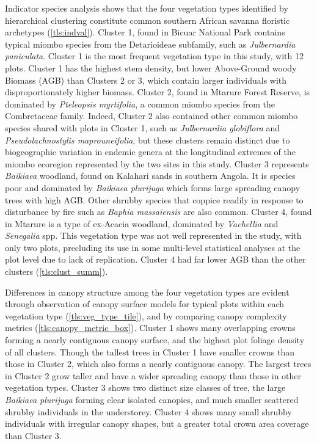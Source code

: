 \begin{refsection}
Indicator species analysis shows that the four vegetation types identified by hierarchical clustering constitute common southern African savanna floristic archetypes (\autoref{tls:indval}). Cluster 1, found in Bicuar National Park contains typical miombo species from the Detarioideae subfamily, such as \textit{Julbernardia paniculata}. Cluster 1 is the most frequent vegetation type in this study, with 12 plots. Cluster 1 has the highest stem density, but lower Above-Ground woody Biomass (AGB) than Clusters 2 or 3, which contain larger individuals with disproportionately higher biomass. Cluster 2, found in Mtarure Forest Reserve, is dominated by \textit{Pteleopsis myrtifolia}, a common miombo species from the Combretaceae family. Indeed, Cluster 2 also contained other common miombo species shared with plots in Cluster 1, such as \textit{Julbernardia globiflora} and \textit{Pseudolachnostylis maprouneifolia}, but these clusters remain distinct due to biogeographic variation in endemic genera at the longitudinal extremes of the miombo ecoregion represented by the two sites in this study. Cluster 3 represents \textit{Baikiaea} woodland, found on Kalahari sands in southern Angola. It is species poor and dominated by \textit{Baikiaea plurijuga} which forms large spreading canopy trees with high AGB. Other shrubby species that coppice readily in response to disturbance by fire such as \textit{Baphia massaiensis} are also common. Cluster 4, found in Mtarure is a type of ex-Acacia woodland, dominated by \textit{Vachellia} and \textit{Senegalia} spp. This vegetation type was not well represented in the study, with only two plots, precluding its use in some multi-level statistical analyses at the plot level due to lack of replication. Cluster 4 had far lower AGB than the other clusters (\autoref{tls:clust_summ}). 

Differences in canopy structure among the four vegetation types are evident through observation of canopy surface models for typical plots within each vegetation type (\autoref{tls:veg_type_tile}), and by comparing canopy complexity metrics (\autoref{tls:canopy_metric_box}). Cluster 1 shows many overlapping crowns forming a nearly contiguous canopy surface, and the highest plot foliage density of all clusters. Though the tallest trees in Cluster 1 have smaller crowns than those in Cluster 2, which also forms a nearly contiguous canopy. The largest trees in Cluster 2 grow taller and have a wider spreading canopy than those in other vegetation types. Cluster 3 shows two distinct size classes of tree, the large \textit{Baikiaea plurijuga} forming clear isolated canopies, and much smaller scattered shrubby individuals in the understorey. Cluster 4 shows many small shrubby individuals with irregular canopy shapes, but a greater total crown area coverage than Cluster 3. 


\end{refsection}
